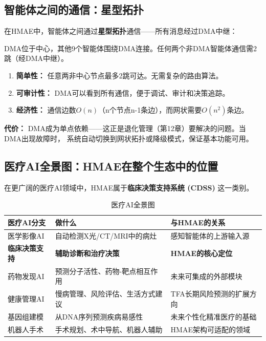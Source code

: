 \documentclass[11pt,a4paper]{ctexart}
\begin{document}
\subsection{智能体之间的通信：星型拓扑}

在HMAE中，智能体之间通过\textbf{星型拓扑}通信——所有消息经过DMA中继：

\begin{center}
DMA位于中心，其他9个智能体围绕DMA连接。任何两个非DMA智能体通信需2跳（经DMA中继）。
\end{center}

\begin{keybox}
\begin{enumerate}[nosep]
\item \textbf{简单性：} 任意两非中心节点最多2跳可达。无需复杂的路由算法。
\item \textbf{可审计性：} DMA可以看到所有通信，便于调试、审计和决策追踪。
\item \textbf{经济性：} 通信边数$O(n)$（n个节点n-1条边），而网状需要$O(n^2)$条边。
\end{enumerate}
\textbf{代价：} DMA成为单点依赖——这正是退化管理（第12章）要解决的问题。当DMA出现故障时，
系统自动切换到网状拓扑或降级模式，保证基本功能可用。
\end{keybox}

\subsection{医疗AI全景图：HMAE在整个生态中的位置}

在更广阔的医疗AI领域中，HMAE属于\textbf{临床决策支持系统 (CDSS)} 这一类别。

\begin{table}[H]
\centering
\small
\begin{tabular}{p{2.8cm}p{5.5cm}p{5.5cm}}
\toprule
\textbf{医疗AI分支} & \textbf{做什么} & \textbf{与HMAE的关系} \\
\midrule
医学影像AI & 自动检测X光/CT/MRI中的病灶 & 感知智能体的上游输入源 \\
\textbf{临床决策支持} & \textbf{辅助诊断和治疗决策} & \textbf{HMAE的核心定位} \\
药物发现AI & 预测分子活性、药物-靶点相互作用 & 未来可集成的外部模块 \\
健康管理AI & 慢病管理、风险评估、生活方式建议 & TFA长期风险预测的扩展方向 \\
基因组建模 & 从DNA序列预测疾病易感性 & 未来个性化精准医疗的基础 \\
机器人手术 & 手术规划、术中导航、机器人辅助 & HMAE架构可适配的领域 \\
\bottomrule
\end{tabular}
\caption{医疗AI全景图}
\end{table}
\end{document}
